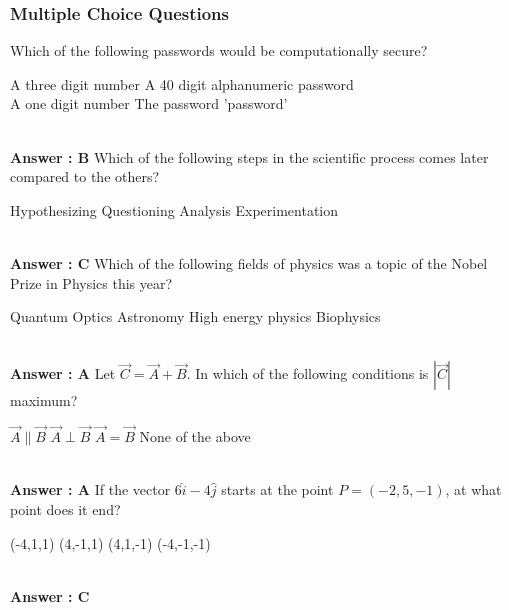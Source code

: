 \documentclass[12pt,addpoints]{exam}
\begin{document}
{{{				\subsubsection*{Multiple Choice Questions}
				\begin{questions}
					\question Which of the following passwords would be computationally secure?\\
					\begin{oneparchoices}
						\choice A three digit number
						\choice A 40 digit alphanumeric password \\
						\choice A one digit number
						\choice The password 'password'
					\end{oneparchoices}
					\\ \textbf{Answer : B}
					\question Which of the following steps in the scientific process comes later compared to the others? \\
					\begin{oneparchoices}
						\choice Hypothesizing
						\choice Questioning
						\choice Analysis
						\choice Experimentation
					\end{oneparchoices}
					\\ \textbf{Answer : C}	
					\question Which of the following fields of physics was a topic of the Nobel Prize in Physics this year? \\
					\begin{oneparchoices}
						\choice Quantum Optics
						\choice Astronomy
						\choice High energy physics
						\choice Biophysics
					\end{oneparchoices}
					\\ \textbf{Answer : A}
					\question Let $\vec{C}=\vec{A}+\vec{B}$. In which of the following conditions is $|\vec{C}|$ maximum? \\
					\begin{oneparchoices}
						\choice $\vec{A}\parallel\vec{B}$
						\choice $\vec{A}\perp\vec{B}$
						\choice $\vec{A}=\vec{B}$
						\choice None of the above
					\end{oneparchoices}
					\\ \textbf{Answer : A}
					\question If the vector $6\hat{i}-4\hat{j}$ starts at the point $P =(-2,5,-1)$, at what point does it end? \\
					\begin{oneparchoices}
						\choice (-4,1,1)
						\choice (4,-1,1)
						\choice (4,1,-1)
						\choice (-4,-1,-1)
					\end{oneparchoices}
					\\ \textbf{Answer : C}

\end{questions}}}}
\end{document}
